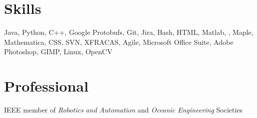 \documentclass{article}
\begin{document}
{\begin{multicols}{2}
    \section*{Skills} 
    \noindent
    Java, Python, C++, Google Protobufs, Git, Jira, Bash, HTML, Matlab, \LaTeXe, Maple, Mathematica, CSS, SVN, XFRACAS, Agile, Microsoft Office Suite, Adobe Photoshop, GIMP, Linux, OpenCV
    \section*{Professional} 
    \noindent
    IEEE member of \textsl{Robotics and Automation} and \textsl{Oceanic Engineering} Societies  
\end{multicols}
}
\end{document}
